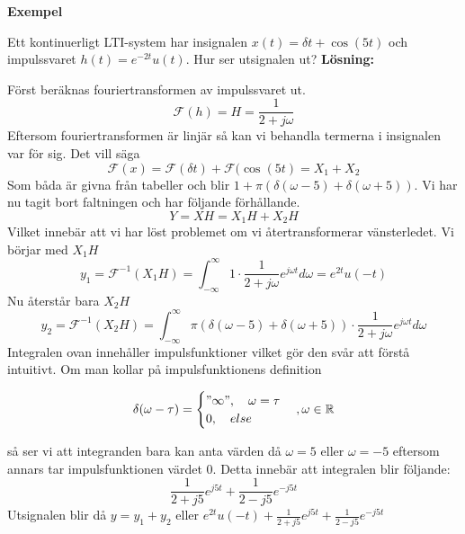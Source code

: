 \documentclass{article}
\begin{document}
\textbf{Exempel} %

Ett kontinuerligt LTI-system har insignalen $x(t)=\delta{t} + \cos(5 t)$ och impulssvaret $h(t) = e^{-2 t} u(t)$. Hur ser utsignalen ut?
\textbf{Lösning:}

Först beräknas fouriertransformen av impulssvaret ut.
\[\mathcal{F}(h) = H = \frac{1}{2+j \omega}\]
Eftersom fouriertransformen är linjär så kan vi behandla termerna i insignalen var för sig. Det vill säga
\[\mathcal{F} (x) = \mathcal{F}(\delta{t}) + \mathcal{F}(\cos(5 t) = X_1 + X_2 \]
Som båda är givna från tabeller och blir $1+\pi(\delta(\omega - 5) + \delta(\omega + 5))$. Vi har nu tagit bort faltningen och har följande förhållande.
\[Y = X H = X_1 H + X_2 H\]
Vilket innebär att vi har löst problemet om vi återtransformerar vänsterledet. Vi börjar med $X_1 H$
\[y_1=\mathcal{F}^{-1}(X_1 H) =  \int_{-\infty}^{\infty} 1 \cdot \frac{1}{2+j \omega} e^{j \omega t} d\omega = e^{2 t} u(-t)\]
Nu återstår bara $X_2 H$
\[y_2=\mathcal{F}^{-1}(X_2 H) = \int_{-\infty}^{\infty} \pi(\delta(\omega - 5) + \delta(\omega + 5)) \cdot \frac{1}{2+j \omega} e^{j \omega t} d\omega \]
Integralen ovan innehåller impulsfunktioner vilket gör den svår att förstå intuitivt. Om man kollar på impulsfunktionens definition

\[
\delta(\omega - \tau)=
\begin{cases}
"\infty",\quad \omega = \tau \\
0, \quad else
\end{cases}, \omega \in \mathbb{R}
\]

så ser vi att integranden bara kan anta värden då $\omega=5$ eller $\omega =-5$ eftersom annars tar impulsfunktionen värdet 0. Detta innebär att integralen blir följande:
\[\frac{1}{2+j 5} e^{j 5 t} + \frac{1}{2-j 5} e^{-j 5 t}\] %
Utsignalen blir då $y=y_1 + y_2$ eller $e^{2 t} u(-t) + \frac{1}{2+j 5} e^{j 5 t} + \frac{1}{2-j 5} e^{-j 5 t}$
\end{document}
